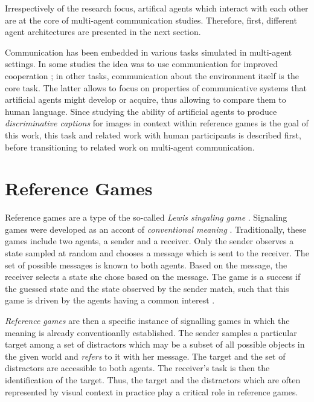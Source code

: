 Irrespectively of the research focus, artifical agents which interact with each other are at the core of multi-agent communication studies. Therefore, first, different agent architectures are presented in the next section.


Communication has been embedded in various tasks simulated in multi-agent settings. In some studies the idea was to use communication for improved cooperation \parencite[e. g.,][]{foerster2016learning}; in other tasks, communication about the environment itself is the core task. The latter allows to focus on properties of communicative systems that artificial agents might develop or acquire, thus allowing to compare them to human language. Since studying the ability of artificial agents to produce \textit{discriminative captions} for images in context within reference games is the goal of this work, this task and related work with human participants is described first, before transitioning to related work on multi-agent communication.


\section{Reference Games}
\label{reference_games}

Reference games are a type of the so-called \textit{Lewis singaling game} \parencite{lewis1969convention, skyrms2010signals}.
Signaling games were developed as an accont of \textit{conventional meaning} \parencite{grice1975logic}. Traditionally, these games include two agents, a sender and a receiver. Only the sender observes a state sampled at random and chooses a message which is sent to the receiver. The set of possible messages is known to both agents. Based on the message, the receiver selects a state she chose based on the message. The game is a success if the guessed state and the state observed by the sender match, such that this game is driven by the agents having a common interest \parencite{lewis1969convention}. 

\textit{Reference games} are then a specific instance of signalling games in which the meaning is already conventioanlly established. The sender samples a particular target among a set of distractors which may be a subset of all possible objects in the given world and \textit{refers} to it with her message. The target and the set of distractors are accessible to both agents. The receiver's task is then the identification of the target. Thus, the target and the distractors which are often represented by visual context in practice play a critical role in reference games.

